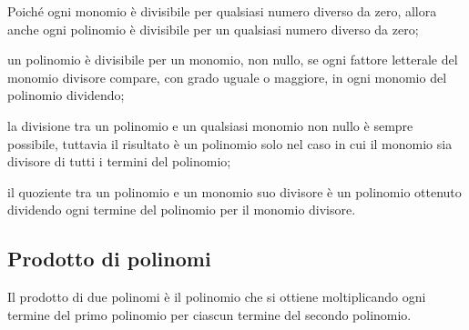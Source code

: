 \begin{enumeratea}
\item Poiché ogni monomio è divisibile per qualsiasi numero diverso
da zero, allora anche ogni polinomio è divisibile per un qualsiasi
numero diverso da zero;
\item un polinomio è divisibile per un monomio, non nullo, se ogni
fattore letterale del monomio divisore compare, con grado uguale o
maggiore, in ogni monomio del polinomio dividendo;
\item la divisione tra un polinomio e un qualsiasi monomio non nullo è
sempre possibile, tuttavia il risultato è un polinomio solo nel caso
in cui il monomio sia divisore di tutti i termini del polinomio;
\item il quoziente tra un polinomio e un monomio suo divisore è un
polinomio ottenuto dividendo ogni termine del polinomio per il monomio
divisore.
\end{enumeratea}


\subsection{Prodotto di polinomi}
\label{subsec:10_poli_prodotto}

Il prodotto di due polinomi è il polinomio che si ottiene
moltiplicando ogni termine del primo polinomio per ciascun termine del
secondo polinomio.

